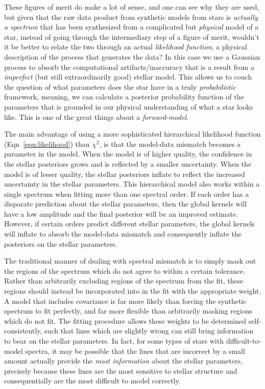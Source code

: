 \documentclass[iop,floatfix]{emulateapj}
\begin{document}
These figures of merit do make a lot of sense, and one can see why they are used, but given that the raw data product from synthetic models from stars is \emph{actually a spectrum} that has been synthesized from a complicated but \emph{physical} model of a star, instead of going through the intermediary step of a figure of merit, wouldn't it be better to relate the two through an actual \emph{likelihood function}, a physical description of the process that generates the data? In this case we use a Gaussian process to absorb the computational artifacts/inaccuracy that is a result from a \emph{imperfect} (but still extraordinarily good) stellar model. This allows us to couch the question of what parameters does the star have in a truly \emph{probabilistic} framework, meaning, we can calculate a posterior probability function of the parameters that is grounded in our physical understanding of what a star looks like. This is one of the great things about a \emph{forward-model}.

The main advantage of using a more sophisticated hierarchical likelihood function (Eqn~\ref{eqn:likelihood}) than $\chi^2$, is that the model-data mismatch becomes a parameter in the model. When the model is of higher quality, the confidence in the stellar posteriors grows and is reflected by a smaller uncertainty. When the model is of lesser quality, the stellar posteriors inflate to reflect the increased uncertainty in the stellar parameters. This hierarchical model also works within a single spectrum when fitting more than one spectral order. If each order has a disparate prediction about the stellar parameters, then the global kernels will have a low amplitude and the final posterior will be an improved estimate. However, if certain orders predict different stellar parameters, the global kernels will inflate to absorb the model-data mismatch and consequently inflate the posteriors on the stellar parameters.

The traditional manner of dealing with spectral mismatch is to simply mask out the regions of the spectrum which do not agree to within a certain tolerance. Rather than arbitrarily excluding regions of the spectrum from the fit, these regions should instead be incorporated into in the fit with the appropriate weight. A model that includes covariance is far more likely than forcing the synthetic spectrum to fit perfectly, and far more flexible than arbitrarily masking regions which do not fit. The fitting procedure allows these weights to be determined self-consistently, such that lines which are slightly wrong can still bring information to bear on the stellar parameters. In fact, for some types of stars with difficult-to-model spectra, it may be possible that the lines that are incorrect by a small amount actually provide the \emph{most information} about the stellar parameters, precisely because these lines are the most sensitive to stellar structure and consequentially are the most difficult to model correctly.
\end{document}
